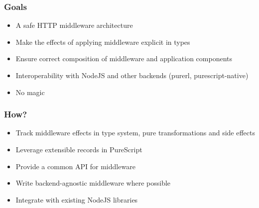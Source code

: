 \begin{frame}
  \frametitle{Goals}
  \begin{itemize}
    \pause
    \item<+-> A safe HTTP middleware architecture
    \item<+-> Make the effects of applying middleware explicit in types
    \item<+-> Ensure correct composition of middleware and application components
    \item<+-> Interoperability with NodeJS and other backends (purerl, purescript-native)
    \item<+-> No magic
  \end{itemize}
\end{frame}

\begin{frame}
  \frametitle{How?}
  \begin{itemize}
    \pause
    \item<+-> Track middleware effects in type system, pure transformations and side effects
    \item<+-> Leverage extensible records in PureScript
    \item<+-> Provide a common API for middleware
    \item<+-> Write backend-agnostic middleware where possible
    \item<+-> Integrate with existing NodeJS libraries
  \end{itemize}
\end{frame}


